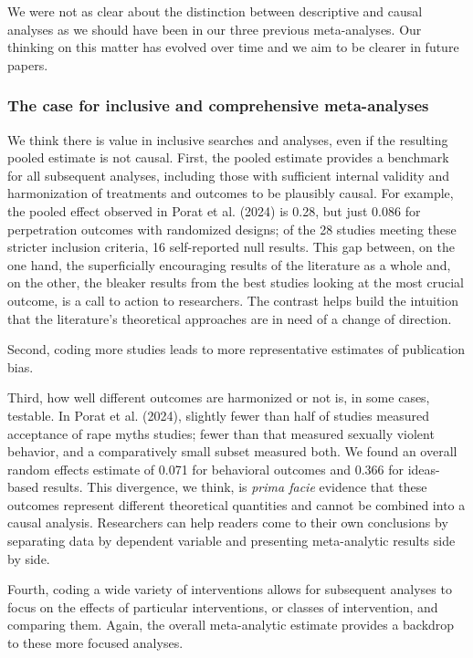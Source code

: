 \documentclass[
  ,jou]{apa6}
\begin{document}
We were not as clear about the distinction between descriptive and causal analyses as we should have been in our three previous meta-analyses. Our thinking on this matter has evolved over time and we aim to be clearer in future papers.

\subsubsection{The case for inclusive and comprehensive meta-analyses}\label{the-case-for-inclusive-and-comprehensive-meta-analyses}

We think there is value in inclusive searches and analyses, even if the resulting pooled estimate is not causal. First, the pooled estimate provides a benchmark for all subsequent analyses, including those with sufficient internal validity and harmonization of treatments and outcomes to be plausibly causal. For example, the pooled effect observed in Porat et al. (2024) is 0.28, but just 0.086 for perpetration outcomes with randomized designs; of the 28 studies meeting these stricter inclusion criteria, 16 self-reported null results. This gap between, on the one hand, the superficially encouraging results of the literature as a whole and, on the other, the bleaker results from the best studies looking at the most crucial outcome, is a call to action to researchers. The contrast helps build the intuition that the literature's theoretical approaches are in need of a change of direction.

Second, coding more studies leads to more representative estimates of publication bias.

Third, how well different outcomes are harmonized or not is, in some cases, testable. In Porat et al. (2024), slightly fewer than half of studies measured acceptance of rape myths studies; fewer than that measured sexually violent behavior, and a comparatively small subset measured both. We found an overall random effects estimate of 0.071 for behavioral outcomes and 0.366 for ideas-based results. This divergence, we think, is \emph{prima facie} evidence that these outcomes represent different theoretical quantities and cannot be combined into a causal analysis. Researchers can help readers come to their own conclusions by separating data by dependent variable and presenting meta-analytic results side by side.

Fourth, coding a wide variety of interventions allows for subsequent analyses to focus on the effects of particular interventions, or classes of intervention, and comparing them. Again, the overall meta-analytic estimate provides a backdrop to these more focused analyses.
\end{document}
